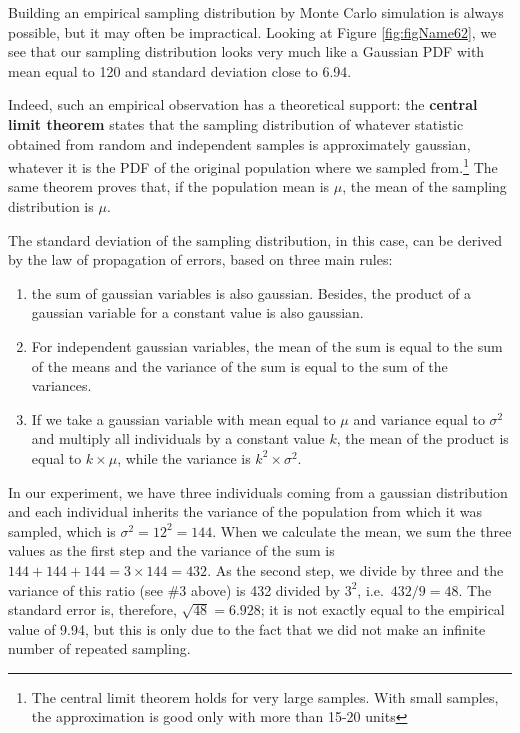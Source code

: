 \documentclass[a4paper,12pt,oneside]{book}
\providecommand{\tightlist}{%
  \setlength{\itemsep}{0pt}\setlength{\parskip}{0pt}}
\begin{document}
Building an empirical sampling distribution by Monte Carlo simulation is always possible, but it may often be impractical. Looking at Figure \ref{fig:figName62}, we see that our sampling distribution looks very much like a Gaussian PDF with mean equal to 120 and standard deviation close to 6.94.

Indeed, such an empirical observation has a theoretical support: the \textbf{central limit theorem} states that the sampling distribution of whatever statistic obtained from random and independent samples is approximately gaussian, whatever it is the PDF of the original population where we sampled from.\footnote{The central limit theorem holds for very large samples. With small samples, the approximation is good only with more than 15-20 units} The same theorem proves that, if the population mean is \(\mu\), the mean of the sampling distribution is \(\mu\).

The standard deviation of the sampling distribution, in this case, can be derived by the law of propagation of errors, based on three main rules:

\begin{enumerate}
\def\labelenumi{\arabic{enumi}.}
\tightlist
\item
  the sum of gaussian variables is also gaussian. Besides, the product of a gaussian variable for a constant value is also gaussian.
\item
  For independent gaussian variables, the mean of the sum is equal to the sum of the means and the variance of the sum is equal to the sum of the variances.
\item
  If we take a gaussian variable with mean equal to \(\mu\) and variance equal to \(\sigma^2\) and multiply all individuals by a constant value \(k\), the mean of the product is equal to \(k \times \mu\), while the variance is \(k^2 \times \sigma^2\).
\end{enumerate}

In our experiment, we have three individuals coming from a gaussian distribution and each individual inherits the variance of the population from which it was sampled, which is \(\sigma^2 = 12^2 = 144\). When we calculate the mean, we sum the three values as the first step and the variance of the sum is \(144 + 144 + 144 = 3 \times 144 = 432\). As the second step, we divide by three and the variance of this ratio (see \#3 above) is 432 divided by \(3^2\), i.e.~\(432/9 = 48\). The standard error is, therefore, \(\sqrt{48} = 6.928\); it is not exactly equal to the empirical value of 9.94, but this is only due to the fact that we did not make an infinite number of repeated sampling.
\end{document}
